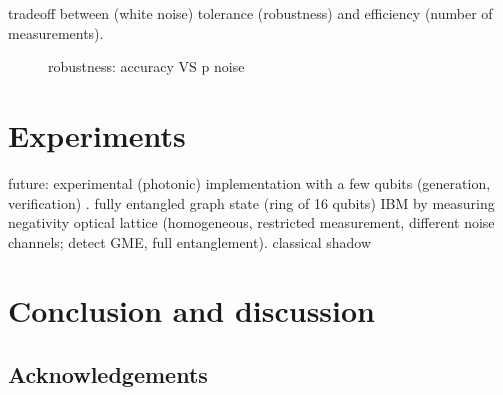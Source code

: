 \documentclass[
aps,
pra,
floatfix,
]{revtex4-2}
\theoremstyle{plain}
\theoremstyle{definition}
\begin{document}

tradeoff between (white noise) tolerance (robustness) and efficiency (number of measurements).

\begin{figure}[!ht]
	\centering
	\caption{robustness: accuracy VS p noise }
\end{figure}


\section{Experiments}\label{sec:experiments}
future: experimental (photonic) implementation with a few qubits (generation, verification) \cite{luEntanglementStructureEntanglement2018}.
fully entangled graph state (ring of 16 qubits) IBM by measuring negativity \cite{wang16qubitIBMUniversal2018}
optical lattice \cite{zhouSchemeCreateVerify2022} (homogeneous, restricted measurement, different noise channels; detect GME, full entanglement).
classical shadow \cite{zhangExperimentalQuantumState2021}
\cite{elbenMixedstateEntanglementLocal2020}
\cite{zhuFlexibleLearningQuantum2022}

\section{Conclusion and discussion}

\subsection*{Acknowledgements}



%


\onecolumngrid
\appendix



\end{document}
